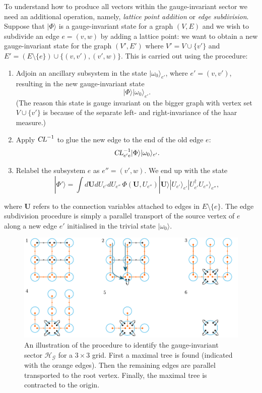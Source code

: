 \documentclass[twocolumn,lengthcheck,superscriptaddress]{revtex4-1}
\def\CL{\textsl{CL}}
\theoremstyle{definition}
\theoremstyle{remark}
\begin{document}
To understand how to produce all vectors within the gauge-invariant sector we need an additional operation, namely, \emph{lattice point addition} or \emph{edge subdivision}. Suppose that $|\Phi\rangle$ is a gauge-invariant state for a graph $(V,E)$ and we wish to subdivide an edge $e = (v,w)$ by adding a lattice point: we want to obtain a new gauge-invariant state for the graph $(V',E')$ where $V' = V\cup \{v'\}$ and $E' = (E\setminus \{e\} )\cup\{ (v,v'), (v',w)\}$. This is carried out using the procedure:
\begin{enumerate}
	\item Adjoin an ancillary subsystem in the state $|\omega_0\rangle_{e'}$, where $e' = (v,v')$, resulting in the new gauge-invariant state
	\begin{equation}
		|\Phi\rangle |\omega_0\rangle_{e'}.
	\end{equation} 
	(The reason this state is gauge invariant on the bigger graph with vertex set $V\cup \{v'\}$ is because of the separate left- and right-invariance of the haar measure.)
	\item Apply $\CL^{-1}$ to glue the new edge to the end of the old edge $e$:
	\begin{equation}
		\CL_{e' e}^{-1}|\Phi\rangle |\omega_0\rangle_{e'}.
	\end{equation}
	\item Relabel the subsystem $e$ as $e'' = (v',w)$. We end up with the state
	\begin{equation}
		|\Phi'\rangle = \int d\mathbf{U}dU_{e'}dU_{e''} \, \Phi(\mathbf{U},U_{e''}) |\mathbf{U}\rangle |U_{e'}\rangle_{e'}  |U^{\dag}_{e'}U_{e''}\rangle_{e''},
	\end{equation}
\end{enumerate}
where $\mathbf{U}$ refers to the connection variables attached to edges in $E\setminus \{e\}$.
The edge subdivision procedure is simply a parallel transport of the source vertex of $e$ along a new edge $e'$ initialised in the trivial state $|\omega_0\rangle$.

\begin{figure}
	\includegraphics{maxtree1.pdf}
	\caption{An illustration of the procedure to identify the gauge-invariant sector $\mathcal{H}_{\mathcal{G}}$ for a $3\times 3$ grid. First a maximal tree is found (indicated with the orange edges). Then the remaining edges are parallel transported to the root vertex. Finally, the maximal tree is contracted to the origin.}\label{fig:gis}
\end{figure}
\end{document}
